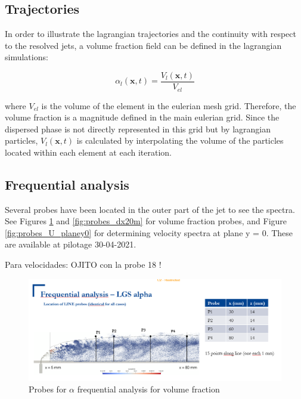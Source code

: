 \subsection{Trajectories}

In order to illustrate the lagrangian trajectories and the continuity with respect to the resolved jets, a volume fraction field can be defined in the lagrangian simulations:

\begin{equation}
\alpha_l \left( \textbf{x}, t \right) = \frac{V_l \left( \textbf{x}, t \right)}{V_{el}}
\end{equation}

where $V_{el}$ is the volume of the element in the eulerian mesh grid. Therefore, the volume fraction is a magnitude defined in the main eulerian grid. Since the dispersed phase is not directly represented in this grid but by lagrangian particles, $V_l \left( \textbf{x}, t \right)$ is calculated by interpolating the volume of the particles located within each element at each iteration.

\subsection{Frequential analysis}

Several probes have been located in the outer part of the jet to see the spectra. See Figures \ref{fig:probes_dx10m} and \ref{fig:probes_dx20m} for volume fraction probes, and Figure \ref{fig:probes_U_planey0} for determining velocity spectra at plane y = 0. These are available at pilotage 30-04-2021.

Para velocidades: OJITO con la probe 18 !

\begin{figure}[h!]
	\centering
	\includegraphics[scale=0.7]{./part2_developments/figures_ch6_lagrangian_JICF/probes_vol_frac}
	\caption{Probes for $\alpha$ frequential analysis for volume fraction}
	\label{fig:probes_dx10m}
\end{figure}


